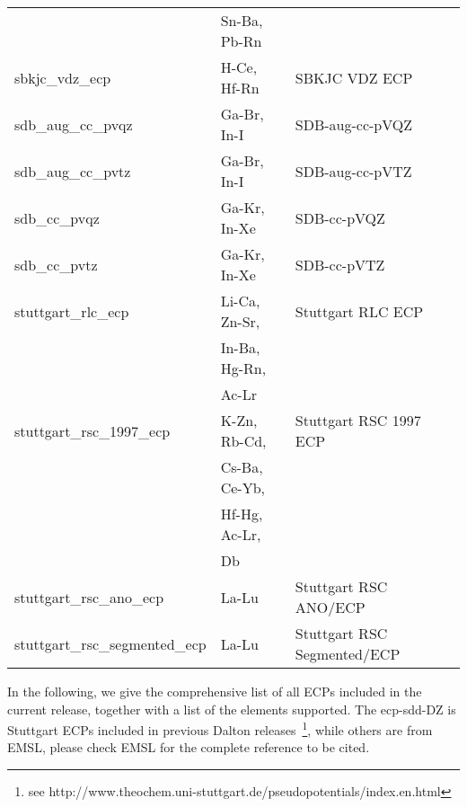\begin{longtable}{lll}
                             & Sn-Ba, Pb-Rn &\\
sbkjc\_vdz\_ecp & H-Ce, Hf-Rn & SBKJC VDZ ECP\\
sdb\_aug\_cc\_pvqz & Ga-Br, In-I & SDB-aug-cc-pVQZ\\
sdb\_aug\_cc\_pvtz & Ga-Br, In-I  & SDB-aug-cc-pVTZ\\
sdb\_cc\_pvqz & Ga-Kr, In-Xe & SDB-cc-pVQZ\\
sdb\_cc\_pvtz & Ga-Kr, In-Xe & SDB-cc-pVTZ\\
stuttgart\_rlc\_ecp & Li-Ca, Zn-Sr, & Stuttgart RLC ECP\\
                    & In-Ba, Hg-Rn, &\\
                    & Ac-Lr &\\
stuttgart\_rsc\_1997\_ecp & K-Zn, Rb-Cd, & Stuttgart RSC 1997 ECP\\
                          & Cs-Ba, Ce-Yb, &\\
                          & Hf-Hg, Ac-Lr, &\\
                          & Db &\\
stuttgart\_rsc\_ano\_ecp & La-Lu & Stuttgart RSC ANO/ECP\\
stuttgart\_rsc\_segmented\_ecp & La-Lu & Stuttgart RSC Segmented/ECP\\
\hline
\end{longtable}

In the following, we give the comprehensive list of all ECPs included in the current release,
together with a list of the elements supported. The ecp-sdd-DZ is Stuttgart
ECPs included in previous Dalton releases~\footnote{see http://www.theochem.uni-stuttgart.de/pseudopotentials/index.en.html},
while others are from EMSL, please check EMSL for the complete reference to be cited.

